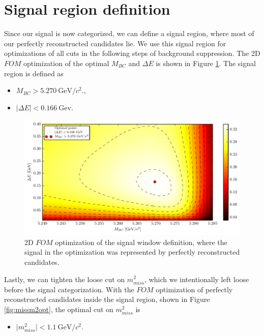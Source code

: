 \documentclass[oneside,a4paper,openany,12pt]{scrbook}
\newcommand {\e}[1]{\mathrm{~#1}}
\begin{document}
\section{Signal region definition}

Since our signal is now categorized, we can define a signal region, where most of our perfectly reconstructed candidates lie. We use this signal region for optimizations of all cuts in the following steps of background suppression. The 2D $FOM$ optimization of the optimal $M_{BC}$ and $\Delta E$ is shown in Figure \ref{fig:sigwin}.
The signal region is defined as
\begin{itemize}
\item $M_{BC} > 5.270\e{GeV}/c^2.$,
\item $\vert \Delta E \vert < 0.166\e{Gev}$. 
\end{itemize}

\begin{figure}[H]
\centering
\captionsetup{width=0.8\linewidth}
\includegraphics[width=\linewidth]{fig/sigWin}
\caption{2D $FOM$ optimization of the signal window definition, where the signal in the optimization was represented by perfectly reconstructed candidates.}
\label{fig:sigwin}
\end{figure}

Lastly, we can tighten the loose cut on $m_{miss}^2$, which we intentionally left loose before the signal categorization. With the $FOM$ optimization of perfectly reconstructed candidates inside the signal region, shown in Figure \ref{fig:missm2opt}, the optimal cut on $m_{miss}^2$ is 

\begin{itemize}
\item $\vert m_{miss}^2 \vert < 1.1\e{GeV}/c^2$.
\end{itemize}
\end{document}
